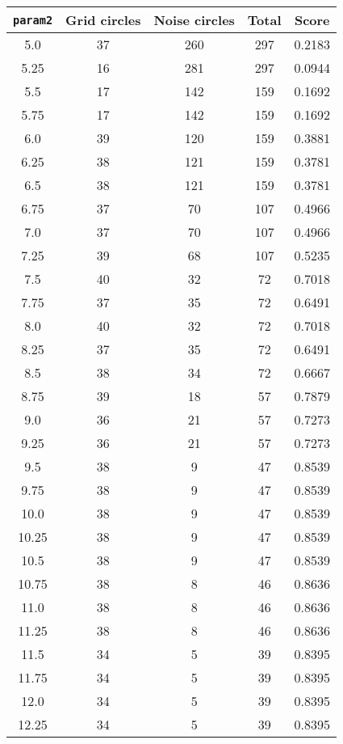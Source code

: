 \documentclass[letterpaper, 12pt]{article}
\begin{document}
\begin{longtable}{|c|c|c|c|c|}
\hline
\textbf{\texttt{param2}} & \textbf{Grid circles} & \textbf{Noise circles} & \textbf{Total} & \textbf{Score} \\
\hline
5.0 & 37 & 260 & 297 & 0.2183 \\
\hline
5.25 & 16 & 281 & 297 & 0.0944 \\
\hline
5.5 & 17 & 142 & 159 & 0.1692 \\
\hline
5.75 & 17 & 142 & 159 & 0.1692 \\
\hline
6.0 & 39 & 120 & 159 & 0.3881 \\
\hline
6.25 & 38 & 121 & 159 & 0.3781 \\
\hline
6.5 & 38 & 121 & 159 & 0.3781 \\
\hline
6.75 & 37 & 70 & 107 & 0.4966 \\
\hline
7.0 & 37 & 70 & 107 & 0.4966 \\
\hline
7.25 & 39 & 68 & 107 & 0.5235 \\
\hline
7.5 & 40 & 32 & 72 & 0.7018 \\
\hline
7.75 & 37 & 35 & 72 & 0.6491 \\
\hline
8.0 & 40 & 32 & 72 & 0.7018 \\
\hline
8.25 & 37 & 35 & 72 & 0.6491 \\
\hline
8.5 & 38 & 34 & 72 & 0.6667 \\
\hline
8.75 & 39 & 18 & 57 & 0.7879 \\
\hline
9.0 & 36 & 21 & 57 & 0.7273 \\
\hline
9.25 & 36 & 21 & 57 & 0.7273 \\
\hline
9.5 & 38 & 9 & 47 & 0.8539 \\
\hline
9.75 & 38 & 9 & 47 & 0.8539 \\
\hline
10.0 & 38 & 9 & 47 & 0.8539 \\
\hline
10.25 & 38 & 9 & 47 & 0.8539 \\
\hline
10.5 & 38 & 9 & 47 & 0.8539 \\
\hline
10.75 & 38 & 8 & 46 & 0.8636 \\
\hline
11.0 & 38 & 8 & 46 & 0.8636 \\
\hline
11.25 & 38 & 8 & 46 & 0.8636 \\
\hline
11.5 & 34 & 5 & 39 & 0.8395 \\
\hline
11.75 & 34 & 5 & 39 & 0.8395 \\
\hline
12.0 & 34 & 5 & 39 & 0.8395 \\
\hline
12.25 & 34 & 5 & 39 & 0.8395 \\
\hline

\end{longtable}
\end{document}
